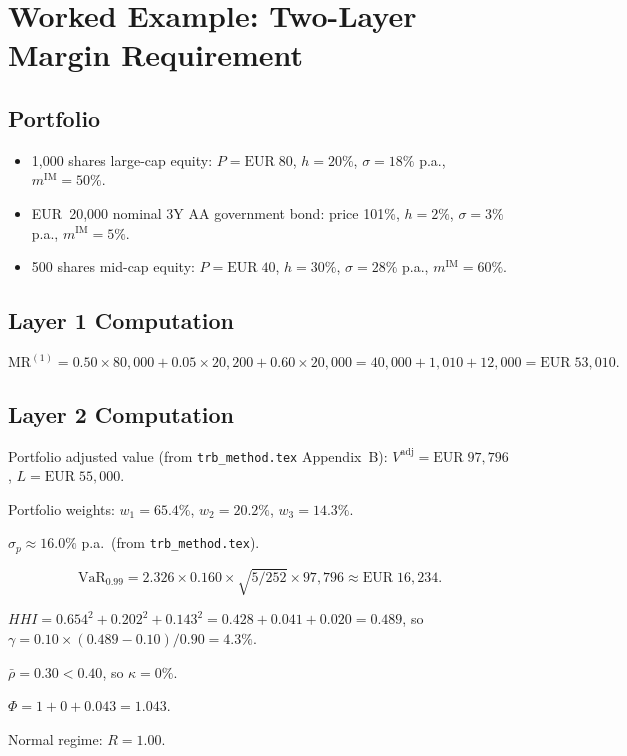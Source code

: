 \documentclass[12pt, a4paper]{article}
\newcommand{\MR}{\mathrm{MR}}
\newcommand{\IM}{\mathrm{IM}}
\newcommand{\VaR}{\mathrm{VaR}}
\begin{document}
\section{Worked Example: Two-Layer Margin Requirement}
\label{app:example}

\subsection*{Portfolio}
\begin{itemize}[leftmargin=1.5em]
    \item 1,000 shares large-cap equity: $P = \text{EUR}\;80$, $h = 20\%$,
    $\sigma = 18\%$ p.a., $m^{\IM} = 50\%$.
    \item EUR~20,000 nominal 3Y AA government bond: price 101\%,
    $h = 2\%$, $\sigma = 3\%$ p.a., $m^{\IM} = 5\%$.
    \item 500 shares mid-cap equity: $P = \text{EUR}\;40$, $h = 30\%$,
    $\sigma = 28\%$ p.a., $m^{\IM} = 60\%$.
\end{itemize}

\subsection*{Layer 1 Computation}
\[
\MR^{(1)} = 0.50 \times 80{,}000 + 0.05 \times 20{,}200 + 0.60 \times 20{,}000
= 40{,}000 + 1{,}010 + 12{,}000 = \text{EUR}\;53{,}010.
\]

\subsection*{Layer 2 Computation}
Portfolio adjusted value (from \texttt{trb\_method.tex} Appendix~B):
$V^{\mathrm{adj}} = \text{EUR}\;97{,}796$, $L = \text{EUR}\;55{,}000$.

Portfolio weights: $w_1 = 65.4\%$, $w_2 = 20.2\%$, $w_3 = 14.3\%$.

$\hat{\sigma}_p \approx 16.0\%$ p.a.\ (from \texttt{trb\_method.tex}).

\[
\VaR_{0.99} = 2.326 \times 0.160 \times \sqrt{5/252} \times 97{,}796
\approx \text{EUR}\;16{,}234.
\]

$HHI = 0.654^2 + 0.202^2 + 0.143^2 = 0.428 + 0.041 + 0.020 = 0.489$,
so $\gamma = 0.10 \times (0.489 - 0.10)/0.90 = 4.3\%$.

$\bar{\rho} = 0.30 < 0.40$, so $\kappa = 0\%$.

$\Phi = 1 + 0 + 0.043 = 1.043$.

Normal regime: $R = 1.00$.
\end{document}
